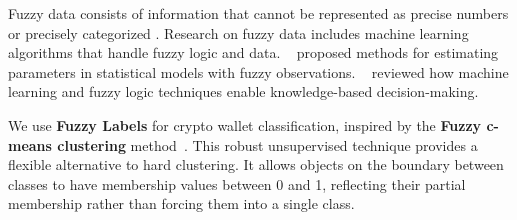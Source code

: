 \documentclass[runningheads]{llncs}
\begin{document}
{Fuzzy data consists of information that cannot be represented as precise numbers or precisely categorized \cite{viertl2011statistical}. Research on fuzzy data \cite{bandemer2012fuzzy} includes machine learning algorithms that handle fuzzy logic and data.
\citeauthor{denoeux2011maximum}~\cite{denoeux2011maximum} proposed methods for estimating parameters in statistical models with fuzzy observations.
\citeauthor{jane2019review}~\cite{jane2019review} reviewed how machine learning and fuzzy logic techniques enable knowledge-based decision-making. 



We use \textbf{Fuzzy Labels} for crypto wallet classification, inspired by the \textbf{Fuzzy c-means clustering} method~\cite{bezdek1984fcm}. 
This robust unsupervised technique provides a flexible alternative to hard clustering. It allows objects on the boundary between classes to have membership values between 0 and 1, reflecting their partial membership rather than forcing them into a single class.

}
\end{document}

